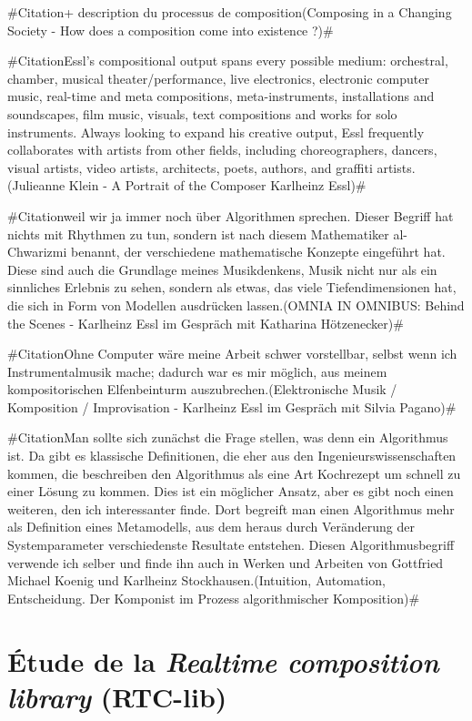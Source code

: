 \documentclass[a4paper,12pt]{article}
\newcommand{\zitat}[2]{\#Citation#1(#2)\#}
\begin{document}
\zitat{+ description du processus de composition}
{Composing in a Changing Society - How does a composition come into existence ?}

\zitat{Essl's compositional output spans every possible medium: orchestral, chamber, musical theater/performance, live electronics, electronic computer music, real-time and meta compositions, meta-instruments, installations and soundscapes, film music, visuals, text compositions and works for solo instruments. Always looking to expand his creative output, Essl frequently collaborates with artists from other fields, including choreographers, dancers, visual artists, video artists, architects, poets, authors, and graffiti artists.}
{Julieanne Klein - A Portrait of the Composer Karlheinz Essl}

\zitat{weil wir ja immer noch über Algorithmen sprechen. Dieser Begriff hat nichts mit Rhythmen zu tun, sondern ist nach diesem Mathematiker al-Chwarizmi benannt, der verschiedene mathematische Konzepte eingeführt hat. Diese sind auch die Grundlage meines Musikdenkens, Musik nicht nur als ein sinnliches Erlebnis zu sehen, sondern als etwas, das viele Tiefendimensionen hat, die sich in Form von Modellen ausdrücken lassen.}
{OMNIA IN OMNIBUS: Behind the Scenes - Karlheinz Essl im Gespräch mit Katharina Hötzenecker}

\zitat{Ohne Computer wäre meine Arbeit schwer vorstellbar, selbst wenn ich Instrumentalmusik mache; dadurch war es mir möglich, aus meinem kompositorischen Elfenbeinturm auszubrechen.}
{Elektronische Musik / Komposition / Improvisation - Karlheinz Essl im Gespräch mit Silvia Pagano}

\zitat{Man sollte sich zunächst die Frage stellen, was denn ein Algorithmus ist. Da gibt es klassische Definitionen, die eher aus den Ingenieurswissenschaften kommen, die beschreiben den Algorithmus als eine Art Kochrezept um schnell zu einer Lösung zu kommen. Dies ist ein möglicher Ansatz, aber es gibt noch einen weiteren, den ich interessanter finde. Dort begreift man einen Algorithmus mehr als Definition eines Metamodells, aus dem heraus durch Veränderung der Systemparameter verschiedenste Resultate entstehen. Diesen Algorithmusbegriff verwende ich selber und finde ihn auch in Werken und Arbeiten von Gottfried Michael Koenig und Karlheinz Stockhausen.}
{Intuition, Automation, Entscheidung. Der Komponist im Prozess algorithmischer Komposition}



\section{Étude de la \emph{Realtime composition library} (RTC-lib)}
\end{document}
